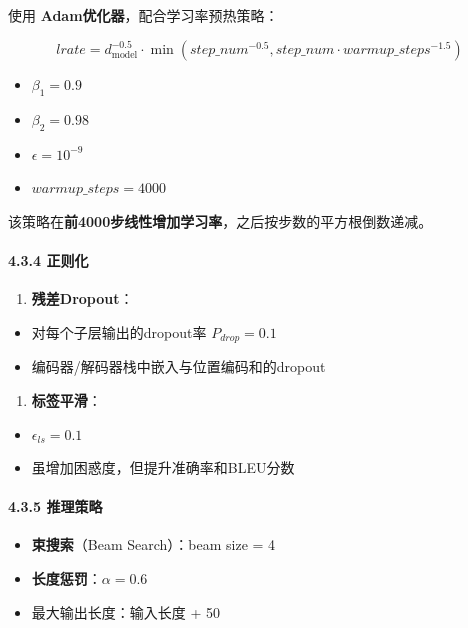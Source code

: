 \documentclass[11pt,a4paper]{article}
\begin{document}
使用 \textbf{Adam优化器}，配合学习率预热策略：

\[
lrate = d_{\text{model}}^{-0.5} \cdot \min\left(step\_num^{-0.5}, step\_num \cdot warmup\_steps^{-1.5}\right)
\]

\begin{itemize}
  \item $\beta_1 = 0.9$
  \item $\beta_2 = 0.98$
  \item $\epsilon = 10^{-9}$
  \item $warmup\_steps = 4000$
\end{itemize}

该策略在\textbf{前4000步线性增加学习率}，之后按步数的平方根倒数递减。

\paragraph{4.3.4 正则化}

\begin{enumerate}
  \item \textbf{残差Dropout}：
\end{enumerate}
\begin{itemize}
  \item 对每个子层输出的dropout率 $P_{drop} = 0.1$
  \item 编码器/解码器栈中嵌入与位置编码和的dropout
\end{itemize}

\begin{enumerate}
  \item \textbf{标签平滑}：
\end{enumerate}
\begin{itemize}
  \item $\epsilon_{ls} = 0.1$
  \item 虽增加困惑度，但提升准确率和BLEU分数
\end{itemize}

\paragraph{4.3.5 推理策略}

\begin{itemize}
  \item \textbf{束搜索}（Beam Search）：beam size = 4
  \item \textbf{长度惩罚}：$\alpha = 0.6$
  \item 最大输出长度：输入长度 + 50
\end{itemize}
\end{document}
